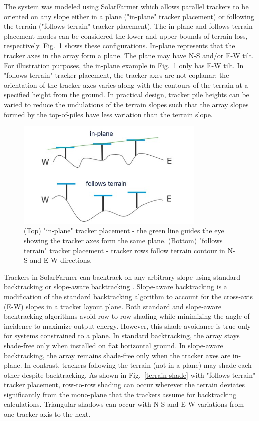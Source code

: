 \documentclass[conference]{IEEEtran}
\begin{document}
The system was modeled using SolarFarmer \cite{Mikofski_8547323} which allows parallel trackers to be oriented on any slope either in a plane ("in-plane" tracker placement) or following the terrain ("follows terrain" tracker placement). The in-plane and follows terrain placement modes can be considered the lower and upper bounds of terrain loss, respectively. Fig.~\ref{tracker-placement} shows these configurations. In-plane represents that the tracker axes in the array form a plane. The plane may have N-S and/or E-W tilt. For illustration purposes, the in-plane example in Fig.~\ref{tracker-placement} only has E-W tilt. In "follows terrain" tracker placement, the tracker axes are not coplanar; the orientation of the tracker axes varies along with the contours of the terrain at a specified height from the ground. In practical design, tracker pile heights can be varied to reduce the undulations of the terrain slopes such that the array slopes formed by the top-of-piles have less variation than the terrain slope.

\begin{figure}[htbp]
\centerline{\includegraphics[width=9cm]{tracker-placement.jpg}}
\caption{(Top) "in-plane" tracker placement - the green line guides the eye showing the tracker axes form the same plane. (Bottom) "follows terrain" tracker placement - tracker rows follow terrain contour in N-S and E-W directions.}
\label{tracker-placement}
\end{figure}

Trackers in SolarFarmer can backtrack on any arbitrary slope using standard backtracking or slope-aware backtracking \cite{Anderson2020}. Slope-aware backtracking is a modification of the standard backtracking algorithm to account for the cross-axis (E-W) slopes in a tracker layout plane. Both standard and slope-aware backtracking algorithms avoid row-to-row shading while minimizing the angle of incidence to maximize output energy. However, this shade avoidance is true only for systems constrained to a plane. In standard backtracking, the array stays shade-free only when installed on flat horizontal ground. In slope-aware backtracking, the array remains shade-free only when the tracker axes are in-plane. In contrast, trackers following the terrain (not in a plane) may shade each other despite backtracking. As shown in Fig.~\ref{terrain-shade} with "follows terrain" tracker placement, row-to-row shading can occur wherever the terrain deviates significantly from the mono-plane that the trackers assume for backtracking calculations. Triangular shadows can occur with N-S and E-W variations from one tracker axis to the next. 
\end{document}
